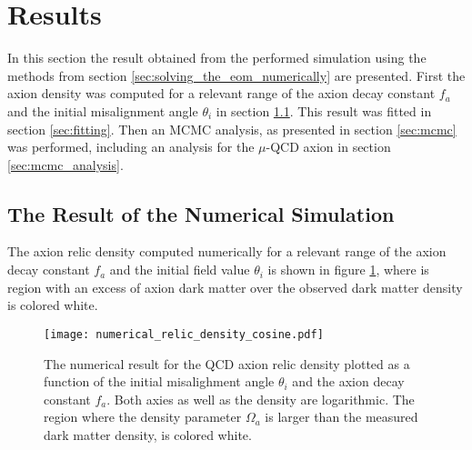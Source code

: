 \documentclass[twoside,a4paper, 12pt]{article}
\numberwithin{equation}{section}
\begin{document}
\newpage
\section{Results}
\label{sec:results}

In this section the result obtained from the performed simulation using 
the methods from section \ref{sec:solving_the_eom_numerically} are presented.
First the axion density was computed for a relevant range of the 
axion decay constant $f_a$ and the initial misalignment angle $\theta_i$ in section \ref{sec:numerical_result}. 
This result was fitted in section \ref{sec:fitting}.
Then an MCMC analysis, as presented in section \ref{sec:mcmc} was performed, including an analysis for 
the $\mu$-QCD axion in section \ref{sec:mcmc_analysis}.

\subsection{The Result of the Numerical Simulation}
\label{sec:numerical_result}
The axion relic density computed numerically
for a relevant range of the axion decay constant $f_a$ and the initial field value $\theta_i$
is shown in figure \ref{fig:numerical_QCD_result}, where is region with an excess of axion dark matter over
the observed dark matter density is colored white.
\begin{figure}[H]
    \centering
    \texttt{[image: numerical\_relic\_density\_cosine.pdf]}
    \caption{
    The numerical result for the QCD axion relic density plotted as a function of the initial misalighment angle $\theta_i$ and the axion decay constant $f_a$.
    Both axies as well as the density are logarithmic.
    The region where the density parameter $\Omega_a$ is larger than the measured dark matter density, is colored white.
    }
    \label{fig:numerical_QCD_result}
\end{figure}
\end{document}
